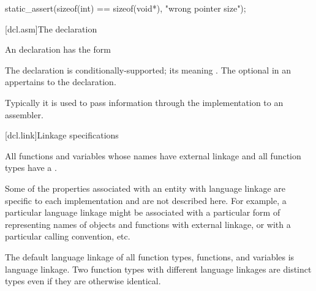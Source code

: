 \documentclass{wg21}
\begin{document}
\begin{example}
\begin{codeblock}
    static_assert(sizeof(int) == sizeof(void*), "wrong pointer size");
\end{codeblock}\end{example}

[dcl.asm]{The  declaration}%
%
%

\pnum
An  declaration has the form

\begin{bnf}
    \br
      \terminal{(}  \terminal{)} \terminal{;}
\end{bnf}

The  declaration is conditionally-supported;  its meaning 
.
The optional  in
an  appertains to the  declaration.
\begin{note}
    Typically it is used to pass information through the implementation to
    an assembler.
\end{note}

[dcl.link]{Linkage specifications}%

\pnum
All functions and variables whose names have external linkage
and all function types
have a .
\begin{note}
    Some of the properties associated with an entity with language linkage
    are specific to each implementation and are not described here. For
    example, a particular language linkage might be associated with a
    particular form of representing names of objects and functions with
    external linkage, or with a particular calling convention, etc.
\end{note}
The default language linkage of all function types, functions, and
variables is \Cpp{} language linkage. Two function types with
different language linkages are distinct types even if they are
otherwise identical.
\end{document}
